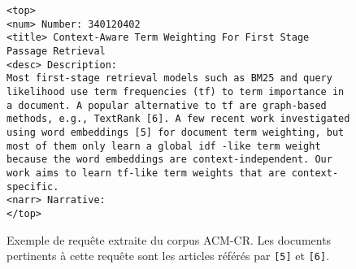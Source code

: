 \begin{figure}
    \centering
    \begin{verbatim}
<top>
<num> Number: 340120402
<title> Context-Aware Term Weighting For First Stage Passage Retrieval
<desc> Description:
Most first-stage retrieval models such as BM25 and query likelihood use term frequencies (tf) to term importance in a document. A popular alternative to tf are graph-based methods, e.g., TextRank [6]. A few recent work investigated using word embeddings [5] for document term weighting, but most of them only learn a global idf -like term weight because the word embeddings are context-independent. Our work aims to learn tf-like term weights that are context-specific.
<narr> Narrative:
</top>
    \end{verbatim}
    \caption{Exemple de requête extraite du corpus ACM-CR. Les documents pertinents à cette requête sont les articles référés par \texttt{[5]} et \texttt{[6]}.}
    \label{fig:acmcr_topic_example}
\end{figure}